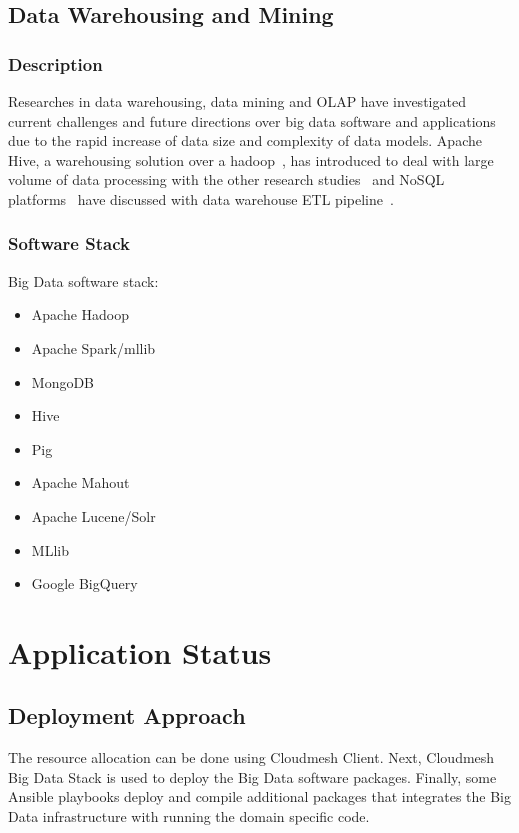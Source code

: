 \documentclass[9pt,twocolumn,twoside]{styles/osajnl}
\begin{document}
\subsection{Data Warehousing and Mining}

\subsubsection{Description}

Researches in data warehousing, data mining and OLAP have investigated
current challenges and future directions over big data software and
applications~\cite{cuzzocrea2013data} due to the rapid
increase of data size and complexity of data models. Apache Hive, a
warehousing solution over a hadoop~\cite{thusoo2009hive}, has introduced to
deal with large volume of data processing with the other research
studies~\cite{chen2010cheetah,he2011rcfile} and NoSQL
platforms~\cite{chevalier2015implementing} have discussed with data warehouse
ETL pipeline~\cite{goodhope2012building}.


\subsubsection{Software Stack}

Big Data software stack:

\begin{itemize}
\item Apache Hadoop
\item Apache Spark/mllib
\item MongoDB
\item Hive
\item Pig
\item Apache Mahout
\item Apache Lucene/Solr
\item MLlib
\item Google BigQuery
\end{itemize}

\section{Application Status}

\subsection{Deployment Approach}

The resource allocation can be done using Cloudmesh Client.  Next,
Cloudmesh Big Data Stack is used to deploy the Big Data software
packages.  Finally, some Ansible playbooks deploy and compile
additional packages that integrates the Big Data infrastructure with
running the domain specific code.
\end{document}
